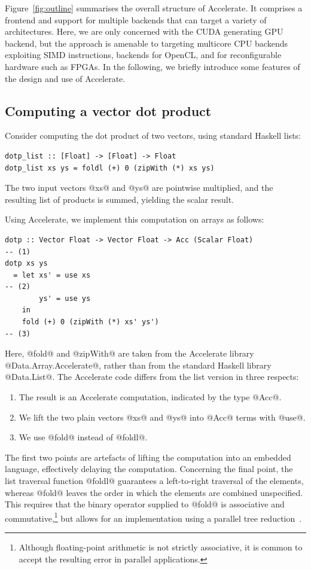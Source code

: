 Figure~\ref{fig:outline} summarises the overall structure of Accelerate. It
comprises a frontend and support for multiple backends that can target a variety
of architectures. Here, we are only concerned with the CUDA generating GPU
backend, but the approach is amenable to targeting multicore CPU backends
exploiting SIMD instructions, backends for OpenCL, and for reconfigurable
hardware such as FPGAs. In the following, we briefly introduce some features of
the design and use of Accelerate.


\subsection{Computing a vector dot product}
\label{sec:computing_dotp}

Consider computing the dot product of two vectors, using standard Haskell lists:
%
\begin{lstlisting}[style=haskell]
dotp_list :: [Float] -> [Float] -> Float
dotp_list xs ys = foldl (+) 0 (zipWith (*) xs ys)
\end{lstlisting}
%
The two input vectors @xs@ and @ys@ are pointwise multiplied, and the resulting
list of products is summed, yielding the scalar result.

Using Accelerate, we implement this computation on arrays as follows:
%
\begin{lstlisting}[style=haskell]
dotp :: Vector Float -> Vector Float -> Acc (Scalar Float)                         -- (1)
dotp xs ys
  = let xs' = use xs                                                               -- (2)
        ys' = use ys
    in
    fold (+) 0 (zipWith (*) xs' ys')                                               -- (3)
\end{lstlisting}
%
Here, @fold@ and @zipWith@ are taken from the Accelerate library
@Data.Array.Accelerate@, rather than from the standard Haskell library
@Data.List@. The Accelerate code differs from the list version in three
respects:
%
\begin{enumerate}
    \item The result is an Accelerate computation, indicated by the type @Acc@.
    \item We lift the two plain vectors @xs@ and @ys@ into @Acc@ terms with @use@.
    \item We use @fold@ instead of @foldl@.
\end{enumerate}
%
The first two points are artefacts of lifting the computation into an embedded
language, effectively delaying the computation. Concerning the final point, the
list traversal function @foldl@ guarantees a left-to-right traversal of the
elements, whereas @fold@ leaves the order in which the elements are combined
unspecified. This requires that the binary operator supplied to @fold@ is
associative and commutative,\footnote{Although floating-point arithmetic is not
strictly associative, it is common to accept the resulting error in parallel
applications.} but allows for an implementation using a parallel tree
reduction~\cite{Chatterjee:1990vj,Sengupta:2007tc}.


